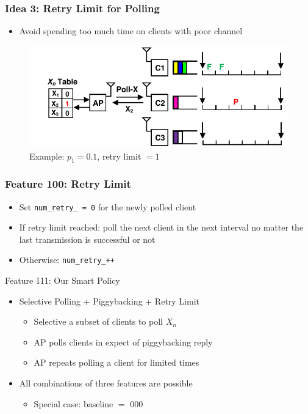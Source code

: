 \documentclass{beamer}
\begin{document}
\begin{frame}
\frametitle{Idea 3: Retry Limit for Polling}
\begin{itemize}
\item Avoid spending too much time on clients with poor channel
\end{itemize}
\begin{figure}
\centering
\includegraphics[scale=0.8]{retry_1.pdf}
\caption{Example: $p_1=0.1$, retry limit $= 1$}
\end{figure}
\end{frame}

\begin{frame}
\frametitle{Feature 100: Retry Limit}
\begin{itemize}
  \item Set \lstinline|num_retry_ = 0| for the newly polled client
  \item If retry limit reached: poll the next client in the next interval
    no matter the last transmission is successful or not
  \item Otherwise: \lstinline|num_retry_++|
\end{itemize}
\end{frame}

\begin{frame}{Feature 111: Our Smart Policy}
  \begin{itemize}
    \item Selective Polling + Piggybacking + Retry Limit
      \begin{itemize}
	\item Selective a subset of clients to poll $X_n$
	\item AP polls clients in expect of piggybacking reply
	\item AP repeats polling a client for limited times
      \end{itemize}
    \item All combinations of three features are possible
      \begin{itemize}
	\item Special case: baseline $=$ 000
      \end{itemize}
  \end{itemize}
\end{frame}
\end{document}
